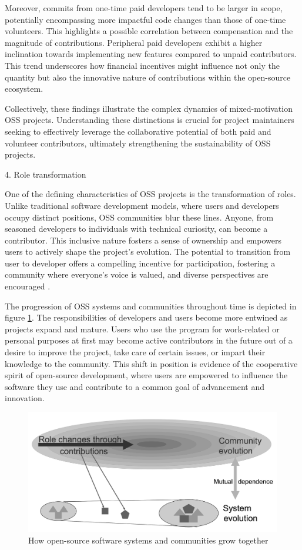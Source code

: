 Moreover, commits from one-time paid developers tend to be larger in scope, potentially encompassing more impactful code changes than those of one-time volunteers. This highlights a possible correlation between compensation and the magnitude of contributions. Peripheral paid developers exhibit a higher inclination towards implementing new features compared to unpaid contributors. This trend underscores how financial incentives might influence not only the quantity but also the innovative nature of contributions within the open-source ecosystem.

Collectively, these findings illustrate the complex dynamics of mixed-motivation OSS projects. Understanding these distinctions is crucial for project maintainers seeking to effectively leverage the collaborative potential of both paid and volunteer contributors, ultimately strengthening the sustainability of OSS projects.

4. Role transformation

One of the defining characteristics of OSS projects is the transformation of roles.  Unlike traditional software development models, where users and developers occupy distinct positions, OSS communities blur these lines.  Anyone, from seasoned developers to individuals with technical curiosity, can become a contributor.  This inclusive nature fosters a sense of ownership and empowers users to actively shape the project's evolution.  The potential to transition from user to developer offers a compelling incentive for participation, fostering a community where everyone's voice is valued, and diverse perspectives are encouraged \cite{06ye2003toward,09lakhani2005hackers}.

The progression of OSS systems and communities throughout time is depicted in figure \ref{fig:roleMotivation}.  The responsibilities of developers and users become more entwined as projects expand and mature.  Users who use the program for work-related or personal purposes at first may become active contributors in the future out of a desire to improve the project, take care of certain issues, or impart their knowledge to the community.  This shift in position is evidence of the cooperative spirit of open-source development, where users are empowered to influence the software they use and contribute to a common goal of advancement and innovation.


\begin{figure}[ht]
    \centering
    \includegraphics[width=0.65\linewidth]{figs/roleMotivation.png}
    \caption{How open-source software systems and communities grow together \cite{06ye2003toward} }
    \label{fig:roleMotivation}
\end{figure}



